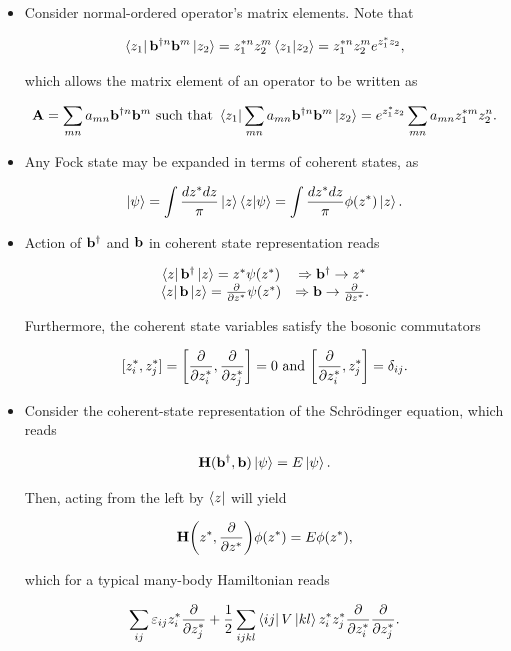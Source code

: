 \documentclass{homework}
\begin{document}
\begin{itemize}
    \item Consider normal-ordered operator's matrix elements. Note that 
    
    $$
        \bra{z_1} {{\bf b}}^{\dagger n}       {{\bf b}}^{m} \ket{z_2} = z_1^{*n} z_2^m \bra{z_1}\ket{z_2} = z_1^{*n} z_2^{m} e^{z_1^* z_2},
    $$
    
    which allows the matrix element of an operator to be written as 
    
    $$
        {\bf A} = \sum_{mn} a_{mn} {{\bf b}}^{\dagger n} {{\bf b}}^{m} \textnormal{ such that } \bra{z_1} \sum_{mn} a_{mn} {{\bf b}}^{\dagger n} {{\bf b}}^{m} \ket{z_2} = e^{z_1^* z_2} \sum_{mn} a_{mn} z_1^{*m} z_2^n.
    $$
    
    \item Any Fock state may be expanded in terms of coherent states, as 
    
    $$
        \ket{\psi} = \int \frac{dz^* dz}{\pi} \ket{z} \bra{z} \ket{\psi} = \int \frac{dz^* dz}{\pi} \phi(z^*) \ket{z}.
    $$
    
    \item Action of ${{\bf b}}^{\dagger}$ and ${\bf b}$ in coherent state representation reads 
    
    $$
    \begin{array}{cc}
        \bra{z} {{\bf b}^\dagger} \ket{z} = z^* \psi(z^*) & \Rightarrow {{\bf b}^\dagger} \rightarrow z^*  \\
        \bra{z} {{\bf b}} \ket{z} = \frac{\partial}{\partial z^*} \psi(z^*) & \Rightarrow {\bf {{\bf b}}} \rightarrow \frac{\partial}{\partial z^*}. 
    \end{array}
    $$
    
    Furthermore, the coherent state variables satisfy the bosonic commutators 
    
    $$
    [z_i^*, z_j^*] = \bigg[\frac{\partial}{\partial z_i^*}, \frac{\partial}{\partial z_j^*}\bigg] = 0 \textnormal{ and } \bigg[\frac{\partial}{\partial z_i^*}, z_j^*\bigg] = \delta_{ij}.
    $$
    
    \item Consider the coherent-state representation of the Schr\"odinger equation, which reads 
    
    $$
        {{\bf H}}({{\bf b}^\dagger},  {{\bf b}}) \ket{\psi} = E \ket{\psi}.
    $$
    
    Then, acting from the left by $\bra{z}$ will yield 
    
    $$
        {{\bf H}}\bigg(z^*,\frac{\partial}{\partial z^*} \bigg) \phi(z^*) = E \phi(z^*),
    $$
    
    which for a typical many-body Hamiltonian reads
    
    $$
        \sum_{ij} \varepsilon_{ij} z_i^* \frac{\partial}{\partial z_j^*} + \frac{1}{2} \sum_{ijkl} \bra{ij} V \ket{kl} z_i^* z_j^* \frac{\partial}{\partial z_i^*} \frac{\partial}{\partial z_j^*}.
    $$
\end{itemize}
\end{document}
